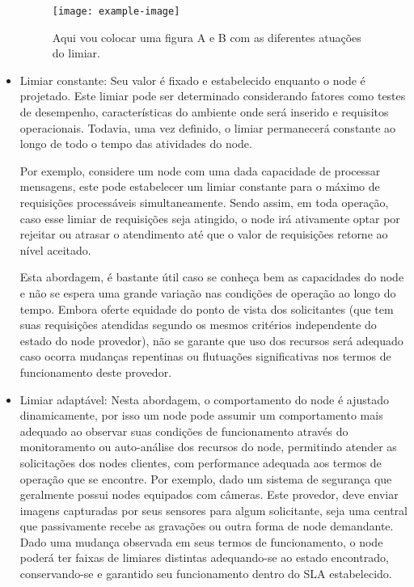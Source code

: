 \begin{itemize}
   \begin{figure}[h]
	\centering
	\noindent\texttt{[image: example-image]} 
	\caption{Aqui vou colocar uma figura A e B com as diferentes atuações do limiar.}
\end{figure}

    \item Limiar constante: Seu valor é fixado e estabelecido enquanto o node é projetado. Este limiar pode ser determinado considerando fatores como testes de desempenho, características do ambiente onde será inserido e requisitos operacionais. Todavia, uma vez definido, o limiar permanecerá constante ao longo de todo o tempo das atividades do node. 
    
    Por exemplo, considere um node com uma dada capacidade de processar mensagens, este pode estabelecer um limiar constante para o máximo de requisições processáveis simultaneamente. Sendo assim, em toda operação, caso esse limiar de requisições seja atingido, o node irá ativamente optar por rejeitar ou atrasar o atendimento até que o valor de requisições retorne ao nível aceitado. 
    
    Esta abordagem, é bastante útil caso se conheça bem as capacidades do node e não se espera uma grande variação nas condições de operação ao longo do tempo. Embora oferte equidade do ponto de vista dos solicitantes (que tem suas requisições atendidas segundo os mesmos critérios independente do estado do node provedor), não se garante que uso dos recursos será adequado caso ocorra mudanças repentinas ou flutuações significativas nos termos de funcionamento deste provedor.
    
    \item Limiar adaptável: Nesta abordagem, o comportamento do node é ajustado dinamicamente, por isso um node pode assumir um comportamento mais adequado ao observar suas condições de funcionamento através do monitoramento ou auto-análise dos recursos do node, permitindo atender as solicitações dos nodes clientes, com performance adequada aos termos de operação que se encontre. Por exemplo, dado um sistema de segurança que geralmente possui nodes equipados com câmeras. Este provedor, deve enviar imagens capturadas por seus sensores para algum solicitante, seja uma central que passivamente recebe as gravações ou outra forma de node demandante. Dado uma mudança observada em seus termos de funcionamento, o node poderá ter faixas de limiares distintas adequando-se ao estado encontrado, conservando-se e garantido seu funcionamento dentro do \acs{SLA} estabelecido.   
    

\end{itemize}
